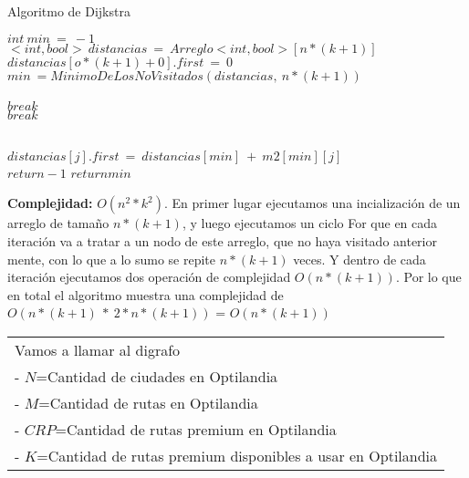 \documentclass{article}
\begin{document}
\begin{algorithm}[h!]
  \caption{Algoritmo de Dijkstra}
\begin{algorithmic}
	\State $int \  min \ = \ -1$
	\State $<int,bool> \ distancias \ = \ Arreglo<int,bool> [n*(k+1)]$ 
	\State $distancias[o *(k+1) + 0].first\ =\ 0 $ \\ 
		 \State $min \ = MinimoDeLosNoVisitados(distancias,\ n*(k+1))$ \\ \\ 
		\State $break$ \\ 
		\State $break$ 
		\EndIf	
		\\
		 \\ 
		
			 
					\State $distancias[j].first\ = \ distancias[min]\ +\ m2[min][j]$ \\ 				
				\EndIf
			\EndIf		
		\EndFor
		\medskip
		 
		\State $return -1$ 
		\Else
		\State $return min$
		\EndIf
	\EndFor
 	
\end{algorithmic}
 \par{\textbf{Complejidad:} $O(n^2*k^2)$. En primer lugar ejecutamos una incialización de un arreglo de tamaño $n*(k+1)$, y luego ejecutamos un ciclo For que en cada iteración va a tratar a un nodo de este arreglo, que no haya visitado anterior mente, con lo que a lo sumo se repite $n*(k+1)$ veces. Y dentro de cada iteración ejecutamos dos operación de complejidad $O(n*(k+1))$. Por lo que en total el algoritmo muestra una complejidad de $O(n*(k+1)\  *\ 2*n*(k+1))$ = $O(n*(k+1))$} 
\end{algorithm}

\begin{tabular}{|l|}
	\hline
 	Vamos a llamar al digrafo\\
 	- \textbf{$N$}=Cantidad de ciudades en Optilandia\\
 	- \textbf{$M$}=Cantidad de rutas en Optilandia\\
 	- \textbf{$CRP$}=Cantidad de rutas premium en Optilandia\\
 	- \textbf{$K$}=Cantidad de rutas premium disponibles a usar en Optilandia\\
 	\hline
\end{tabular}
\end{document}
